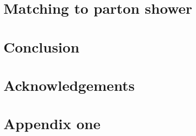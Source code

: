 \documentclass[11pt,epsf]{article}
\begin{document}



\section{Matching to parton shower}
\label{sec:matching}



\section{Conclusion}
\label{sec:conclusion}




\section*{Acknowledgements}



\appendix

\section{Appendix one}




\end{document}
